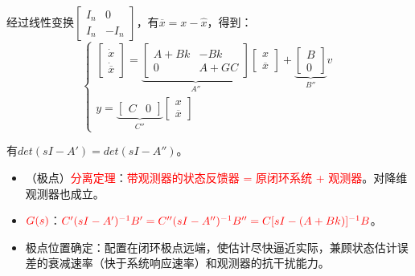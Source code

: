 \documentclass[
12pt, %
a4paper, 
oneside, %
]{scrartcl}
\begin{document}
经过线性变换$ \begin{bmatrix} I_n & 0 \\ I_n & -I_n \end{bmatrix} $，有$ \overline{x} = x - \hat{x} $，得到：
$$ \begin{cases} \begin{bmatrix} \dot{x} \\ \dot{\overline{x}} \end{bmatrix} = \underbrace{\begin{bmatrix} A + B k & -B k \\ 0 & A + G C \end{bmatrix}}_{A''} \begin{bmatrix} x \\ \overline{x} \end{bmatrix} + \underbrace{\begin{bmatrix} B \\ 0 \end{bmatrix}}_{B''} v \\ y = \underbrace{\begin{bmatrix} C & 0 \end{bmatrix}}_{C''} \begin{bmatrix} x \\ \overline{x} \end{bmatrix} \end{cases} $$

有$ det(sI - A') = det(sI - A'') $。
\begin{itemize}
\item （极点）\textcolor{red}{分离定理}：\textcolor{red}{带观测器的状态反馈器 = 原闭环系统 + 观测器}。对降维观测器也成立。
\item $ \textcolor{red}{G(s)} $：$ \textcolor{red}{C'(sI - A')^{-1}B' = C''(sI - A'')^{-1}B'' = C[sI - (A + B k)]^{-1}B} $。
\item 极点位置确定：配置在闭环极点远端，使估计尽快逼近实际，兼顾状态估计误差的衰减速率（快于系统响应速率）和观测器的抗干扰能力。
\end{itemize}
\end{document}
